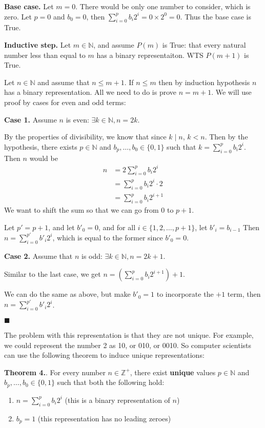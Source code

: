 \documentclass{article}
\newcommand\qedsymbol{\hfill$\blacksquare$}
\newcounter{thcount}
\newcommand\tr{\stepcounter{thcount} \textbf{Theorem 4.\thethcount}. }
\begin{document}
\textbf{Base case.} Let $m = 0$. There would be only one number to consider, 
which is zero. Let $p = 0$ and $b_0 = 0$, then $\sum_{i=0}^{p} b_i 2^i = 0 \times 
2^0 = 0$. Thus the base case is True.

\newpage
\textbf{Inductive step.} Let $m \in \mathbb{N}$, and assume $P (m)$ is True: 
that every natural number less than equal to $m$ has a binary representaiton. 
WTS $P(m+1)$ is True. 

Let $n \in \mathbb{N}$ and assume that $n \leq m + 1 $. If $n \leq m$ then 
by induction hypothesis $n$ has a binary representation. All we need to do is 
prove $n = m+1$. We will use proof by cases for even and odd terms: 

\textbf{Case 1.} Assume $n$ is even: $\exists k \in \mathbb{N}, n = 2k$. 

By the properties of divisibility, we know that since $k \mid n$, $k < n$. 
Then by the hypothesis, there exists $p \in \mathbb{N}$ and $b_p, \ldots, b_0 
\in \{0, 1\}$ such that $k = \sum_{i=0}^{p} b_i 2^i$. Then $n$ would be 
\begin{align*}
    n &= 2 \sum_{i=0}^{p} b_i 2^i\\ 
      &= \sum_{i=0}^{p} b_i 2^i \cdot 2 \\
      &= \sum_{i=0}^{p} b_i 2^{i+1} 
\end{align*}
We want to shift the sum so that we can go from 0 to $p+ 1$. 

Let $p' = p + 1$, and let $b'_0 = 0$, and for all $i \in \{1, 2, \ldots, p+ 1\}$, 
let $b'_i = b_{i-1}$ Then $n = \sum_{i=0}^{p'} b'_i 2^i$, which is equal to the 
former since $b'_0 = 0$.

\textbf{Case 2.} Assume that $n$ is odd: $\exists k \in \mathbb{N}, n = 2k + 1$.

Similar to the last case, we get $n =\left( \sum_{i=0}^{p} b_i 2^{i+1} \right)+ 1$. 

We can do the same as above, but make $b'_0 = 1$ to incorporate the $+1$ term, 
then $n = \sum_{i=0}^{p'} b'_i 2^i$.

\qedsymbol

The problem with this representation is that they are not unique.
For example, we could represent the number 2 as 10, or 010, or 0010. So computer 
scientists can use the following theorem to induce unique representations: 

\tr For every number $n \in \mathbb{Z^+}$, there exist \textbf{unique} values 
$p \in \mathbb{N}$ and $b_p, \ldots, b_0 \in \{0, 1\}$ such that both the following 
hold: 
\begin{enumerate}
    \item $n = \sum_{i=0}^{p} b_i 2^i$ (this is a binary representation of $n$)
    \item $b_p = 1$ (this representation has no leading zeroes)
\end{enumerate}
\end{document}
